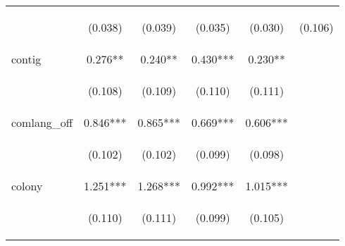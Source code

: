 \begin{center}
\begin{tabular}{lccccc}
\vspace{4pt} & \begin{footnotesize}(0.038)\end{footnotesize} & \begin{footnotesize}(0.039)\end{footnotesize} & \begin{footnotesize}(0.035)\end{footnotesize} & \begin{footnotesize}(0.030)\end{footnotesize} & \begin{footnotesize}(0.106)\end{footnotesize} \\
contig & 0.276** & 0.240** & 0.430*** & 0.230** &  \\
\vspace{4pt} & \begin{footnotesize}(0.108)\end{footnotesize} & \begin{footnotesize}(0.109)\end{footnotesize} & \begin{footnotesize}(0.110)\end{footnotesize} & \begin{footnotesize}(0.111)\end{footnotesize} & \begin{footnotesize}\end{footnotesize} \\
comlang\_off & 0.846*** & 0.865*** & 0.669*** & 0.606*** &  \\
\vspace{4pt} & \begin{footnotesize}(0.102)\end{footnotesize} & \begin{footnotesize}(0.102)\end{footnotesize} & \begin{footnotesize}(0.099)\end{footnotesize} & \begin{footnotesize}(0.098)\end{footnotesize} & \begin{footnotesize}\end{footnotesize} \\
colony & 1.251*** & 1.268*** & 0.992*** & 1.015*** &  \\
\vspace{4pt} & \begin{footnotesize}(0.110)\end{footnotesize} & \begin{footnotesize}(0.111)\end{footnotesize} & \begin{footnotesize}(0.099)\end{footnotesize} & \begin{footnotesize}(0.105)\end{footnotesize} & \begin{footnotesize}\end{footnotesize} \\

\end{tabular}
\end{center}
